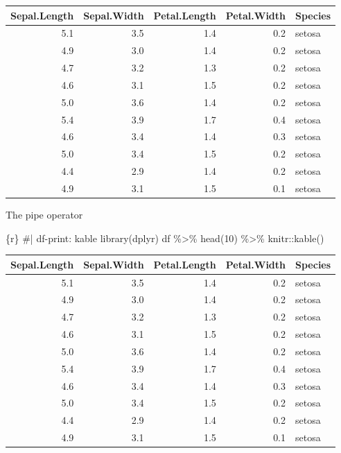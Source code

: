 \documentclass[
  letterpaper,
  DIV=11,
  numbers=noendperiod]{scrreprt}
\newenvironment{Shaded}{\begin{snugshade}}{\end{snugshade}}
\newcommand{\CommentTok}[1]{\textcolor[rgb]{0.37,0.37,0.37}{#1}}
\newcommand{\DecValTok}[1]{\textcolor[rgb]{0.68,0.00,0.00}{#1}}
\newcommand{\FunctionTok}[1]{\textcolor[rgb]{0.28,0.35,0.67}{#1}}
\newcommand{\InformationTok}[1]{\textcolor[rgb]{0.37,0.37,0.37}{#1}}
\newcommand{\NormalTok}[1]{\textcolor[rgb]{0.00,0.23,0.31}{#1}}
\newcommand{\SpecialCharTok}[1]{\textcolor[rgb]{0.37,0.37,0.37}{#1}}
\begin{document}
\begin{longtable}[]{@{}rrrrl@{}}
\toprule()
Sepal.Length & Sepal.Width & Petal.Length & Petal.Width & Species \\
\midrule()
\endhead
5.1 & 3.5 & 1.4 & 0.2 & setosa \\
4.9 & 3.0 & 1.4 & 0.2 & setosa \\
4.7 & 3.2 & 1.3 & 0.2 & setosa \\
4.6 & 3.1 & 1.5 & 0.2 & setosa \\
5.0 & 3.6 & 1.4 & 0.2 & setosa \\
5.4 & 3.9 & 1.7 & 0.4 & setosa \\
4.6 & 3.4 & 1.4 & 0.3 & setosa \\
5.0 & 3.4 & 1.5 & 0.2 & setosa \\
4.4 & 2.9 & 1.4 & 0.2 & setosa \\
4.9 & 3.1 & 1.5 & 0.1 & setosa \\
\bottomrule()
\end{longtable}

The pipe operator

\begin{Shaded}
\begin{Highlighting}[]
\InformationTok{\textasciigrave{}\textasciigrave{}\textasciigrave{}\{r\}}
\CommentTok{\#| df{-}print: kable}
\FunctionTok{library}\NormalTok{(dplyr)}
\NormalTok{df }\SpecialCharTok{\%\textgreater{}\%}
  \FunctionTok{head}\NormalTok{(}\DecValTok{10}\NormalTok{) }\SpecialCharTok{\%\textgreater{}\%}
\NormalTok{  knitr}\SpecialCharTok{::}\FunctionTok{kable}\NormalTok{()}
\InformationTok{\textasciigrave{}\textasciigrave{}\textasciigrave{}}
\end{Highlighting}
\end{Shaded}

\begin{longtable}[]{@{}rrrrl@{}}
\toprule()
Sepal.Length & Sepal.Width & Petal.Length & Petal.Width & Species \\
\midrule()
\endhead
5.1 & 3.5 & 1.4 & 0.2 & setosa \\
4.9 & 3.0 & 1.4 & 0.2 & setosa \\
4.7 & 3.2 & 1.3 & 0.2 & setosa \\
4.6 & 3.1 & 1.5 & 0.2 & setosa \\
5.0 & 3.6 & 1.4 & 0.2 & setosa \\
5.4 & 3.9 & 1.7 & 0.4 & setosa \\
4.6 & 3.4 & 1.4 & 0.3 & setosa \\
5.0 & 3.4 & 1.5 & 0.2 & setosa \\
4.4 & 2.9 & 1.4 & 0.2 & setosa \\
4.9 & 3.1 & 1.5 & 0.1 & setosa \\
\bottomrule()
\end{longtable}
\end{document}
